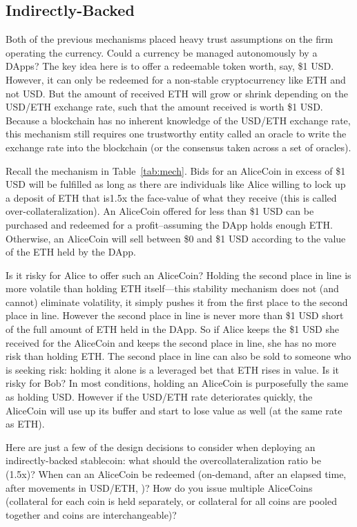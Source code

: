 \subsection{Indirectly-Backed}
\label{sec:dai}

Both of the previous mechanisms placed heavy trust assumptions on the firm operating the currency. Could a currency be managed autonomously by a DApps? The key idea here is to offer a redeemable token worth, say, \$1 USD. However, it can only be redeemed for a non-stable cryptocurrency like ETH and not USD. But the amount of received ETH will grow or shrink depending on the USD/ETH exchange rate, such that the amount received is worth \$1 USD. Because a blockchain has no inherent knowledge of the USD/ETH exchange rate, this mechanism still requires one trustworthy entity called an oracle to write the exchange rate into the blockchain (or the consensus taken across a set of oracles).

Recall the mechanism in Table~\ref{tab:mech}. Bids for an AliceCoin in excess of \$1 USD will be fulfilled as long as there are individuals like Alice willing to lock up a deposit of ETH that is1.5x the face-value of what they receive (this is called over-collateralization). An AliceCoin offered for less than \$1 USD can be purchased and redeemed for a profit--assuming the DApp holds enough ETH. Otherwise, an AliceCoin will sell between \$0 and \$1 USD according to the value of the ETH held by the DApp. 

Is it risky for Alice to offer such an AliceCoin? Holding the second place in line is more volatile than holding ETH itself---this stability mechanism does not (and cannot) eliminate volatility, it simply pushes it from the first place to the second place in line. However the second place in line is never more than \$1 USD short of the full amount of ETH held in the DApp. So if Alice keeps the \$1 USD she received for the AliceCoin and keeps the second place in line, she has no more risk than holding ETH. The second place in line can also be sold to someone who is seeking risk: holding it alone is a leveraged bet that ETH rises in value. Is it risky for Bob? In most conditions, holding an AliceCoin is purposefully the same as holding USD. However if the USD/ETH rate deteriorates quickly, the AliceCoin will use up its buffer and start to lose value as well (at the same rate as ETH).

Here are just a few of the design decisions to consider when deploying an indirectly-backed stablecoin: what should the overcollateralization ratio be (\eg 1.5x)? When can an AliceCoin be redeemed (\eg on-demand, after an elapsed time, after movements in USD/ETH, \etc)? How do you issue multiple AliceCoins (\eg collateral for each coin is held separately, or collateral for all coins are pooled together and coins are interchangeable)?

